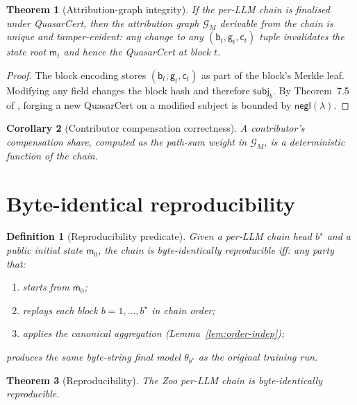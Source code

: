 \documentclass[11pt]{article}
\newtheorem{theorem}{Theorem}
\newtheorem{corollary}[theorem]{Corollary}
\newtheorem{definition}{Definition}
\begin{document}
\begin{theorem}[Attribution-graph integrity]
\label{thm:attr-integ}
If the per-LLM chain is finalised under QuasarCert, then the
attribution graph $\mathcal{G}_M$ derivable from the chain is
unique and tamper-evident: any change to any
$(\mathsf{b}_t, \mathsf{g}_t, \mathsf{c}_t)$ tuple invalidates the
state root $\mathsf{m}_t$ and hence the QuasarCert at block $t$.
\end{theorem}

\begin{proof}
The block encoding stores
$(\mathsf{b}_t, \mathsf{g}_t, \mathsf{c}_t)$ as part of the block's
Merkle leaf. Modifying any field changes the block hash and
therefore $\mathsf{subj}_b$. By Theorem~7.5 of
\cite{quasar-cert}, forging a new QuasarCert on a modified subject
is bounded by $\mathsf{negl}(\lambda)$.
\end{proof}

\begin{corollary}[Contributor compensation correctness]
\label{cor:comp}
A contributor's compensation share, computed as the path-sum
weight in $\mathcal{G}_M$, is a deterministic function of the
chain.
\end{corollary}

\section{Byte-identical reproducibility}
\label{sec:repro}

\begin{definition}[Reproducibility predicate]
\label{def:repro}
Given a per-LLM chain head $b^\star$ and a public initial state
$\mathsf{m}_0$, the chain is \emph{byte-identically reproducible}
iff: any party that:
\begin{enumerate}[nosep]
  \item starts from $\mathsf{m}_0$;
  \item replays each block $b = 1, \ldots, b^\star$ in chain order;
  \item applies the canonical aggregation
        (Lemma~\ref{lem:order-indep});
\end{enumerate}
produces the same byte-string final model
$\theta_{b^\star}$ as the original training run.
\end{definition}

\begin{theorem}[Reproducibility]
\label{thm:repro}
The Zoo per-LLM chain is byte-identically reproducible.
\end{theorem}
\end{document}
